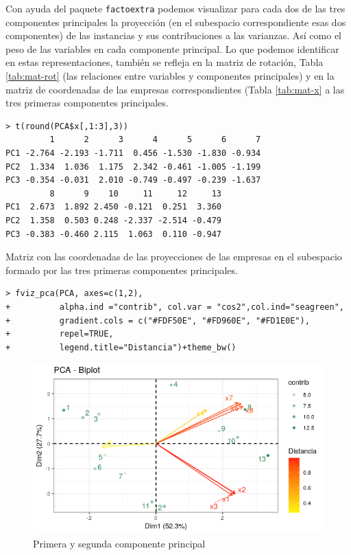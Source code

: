 \documentclass[12pt]{article}
\begin{document}
Con ayuda del paquete \texttt{factoextra} podemos visualizar para cada
dos de las tres componentes principales la proyección (en el
subespacio correspondiente esas dos componentes) de las instancias y
sus contribuciones a las varianzas. Así como el peso de las variables
en cada componente principal. Lo que podemos identificar en estas
representaciones, también se refleja en la matriz de rotación, Tabla \ref{tab:mat-rot}
(las relaciones entre variables y componentes principales) y en la matriz
de coordenadas de las empresas correspondientes (Tabla \ref{tab:mat-x} a las tres primeras
componentes principales.

\begin{table}[H]
  \centering
  \begin{verbatim}
> t(round(PCA$x[,1:3],3))
         1      2      3      4      5      6      7
PC1 -2.764 -2.193 -1.711  0.456 -1.530 -1.830 -0.934
PC2  1.334  1.036  1.175  2.342 -0.461 -1.005 -1.199
PC3 -0.354 -0.031  2.010 -0.749 -0.497 -0.239 -1.637
         8      9    10     11     12     13 
PC1  2.673  1.892 2.450 -0.121  0.251  3.360
PC2  1.358  0.503 0.248 -2.337 -2.514 -0.479
PC3 -0.383 -0.460 2.115  1.063  0.110 -0.947
\end{verbatim}
  \caption{Matriz con las coordenadas de las proyecciones de las empresas en el subespacio formado por las tres primeras componentes principales.}
  \label{tab:mat-x}
\end{table} \vspace{-5mm}

\begin{verbatim}
> fviz_pca(PCA, axes=c(1,2),
+          alpha.ind ="contrib", col.var = "cos2",col.ind="seagreen",
+          gradient.cols = c("#FDF50E", "#FD960E", "#FD1E0E"),
+          repel=TRUE,
+          legend.title="Distancia")+theme_bw()
\end{verbatim}

\begin{figure}[H]
  \centering
  \includegraphics[width=120mm]{imgs/biplot12}
  \caption{Primera y segunda componente principal}
  \label{fig:biplot12}
\end{figure}
\end{document}
